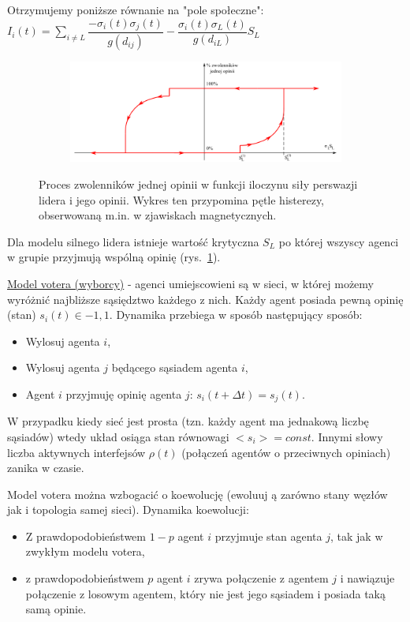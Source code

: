 Otrzymujemy poniższe równanie na "pole społeczne":\newline
$ I_i(t) = \sum_{i\neq L} \dfrac{-\sigma_i(t)\sigma_j(t)}{g(d_{ij})} - \dfrac{\sigma_i(t)\sigma_L(t)}{g(d_{iL})}S_L $

\begin{figure} [H]
	\centering
	\begin{subfigure}{.99\textwidth}
		\centering
		\includegraphics[width=1.0\linewidth]{EDMIIssues/Figures/lider.png}
	\end{subfigure}
	\caption{Proces zwolenników jednej opinii w funkcji iloczynu siły perswazji lidera i jego opinii. Wykres ten przypomina pętle histerezy, obserwowaną m.in. w zjawiskach magnetycznych.}
	\label{lider}
\end{figure}

Dla modelu silnego lidera istnieje wartość krytyczna $ S_L $ po której wszyscy agenci w grupie przyjmują wspólną opinię (rys.~\ref{lider}).

\underline{Model votera (wyborcy)} - agenci umiejscowieni są w sieci, w której możemy wyróżnić najbliższe sąsiędztwo każdego z nich. Każdy agent posiada pewną opinię (stan) $ s_i(t) \in {-1, 1} $. Dynamika przebiega w sposób następujący sposób:
\begin{itemize}
	\item Wylosuj agenta $ i $,
	\item Wylosuj agenta $ j $ będącego sąsiadem agenta $ i $,
	\item Agent $ i $ przyjmuję opinię agenta $ j $: $ s_i(t+\Delta t) = s_j(t) $.
\end{itemize}

W przypadku kiedy sieć jest prosta (tzn. każdy agent ma jednakową liczbę sąsiadów) wtedy układ osiąga stan równowagi $ <s_i> = const $. Innymi słowy liczba aktywnych interfejsów $ \rho (t) $ (połączeń agentów o przeciwnych opiniach) zanika w czasie.

Model votera można wzbogacić o koewolucję (ewoluuj ą zarówno stany węzłów jak i topologia samej
sieci). Dynamika koewolucji:
\begin{itemize}
	\item Z prawdopodobieństwem $ 1 - p $ agent $ i $ przyjmuje stan agenta $ j $, tak jak w zwykłym modelu votera,
	\item z prawdopodobieństwem $ p $ agent $ i $ zrywa połączenie z agentem $ j $ i nawiązuje połączenie z losowym agentem, który nie jest jego sąsiadem i posiada taką samą opinie.
\end{itemize}

